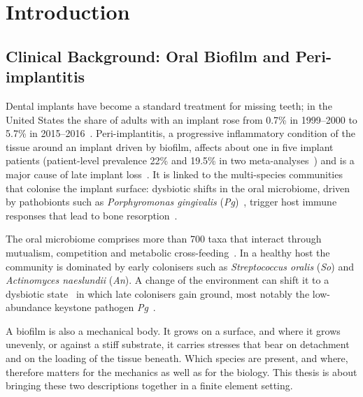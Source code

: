 \chapter{Introduction}
\label{ch:intro}


\section{Clinical Background: Oral Biofilm and Peri-implantitis}
\label{sec:intro_clinical}

Dental implants have become a standard treatment for missing teeth; in the United States the share of adults with an implant rose from 0.7\% in 1999--2000 to 5.7\% in 2015--2016~\cite{Elani2018ImplantTrends}.
Peri-implantitis, a progressive inflammatory condition of the tissue around an implant driven by biofilm, affects about one in five implant patients (patient-level prevalence 22\% and 19.5\% in two meta-analyses~\cite{Derks2015PeriImplantEpi, Diaz2022PeriImplantPrevalence}) and is a major cause of late implant loss~\cite{Berglundh2018Peri, Schwarz2022PeriImplantitis, Sedghi2021PeriImplant}.
It is linked to the multi-species communities that colonise the implant surface: dysbiotic shifts in the oral microbiome, driven by pathobionts such as \textit{Porphyromonas gingivalis} (\textit{Pg})~\cite{Mysak2014Pg}, trigger host immune responses that lead to bone resorption~\cite{Hajishengallis2012Dysbiosis, Lamont2018Periodontal}.

The oral microbiome comprises more than 700 taxa that interact through mutualism, competition and metabolic cross-feeding~\cite{Kolenbrander2010OralMultispecies, Dewhirst2010HOMD}.
In a healthy host the community is dominated by early colonisers such as \textit{Streptococcus oralis} (\textit{So}) and \textit{Actinomyces naeslundii} (\textit{An}).
A change of the environment can shift it to a dysbiotic state~\cite{Marsh2003Dental} in which late colonisers gain ground, most notably the low-abundance keystone pathogen \textit{Pg}~\cite{Hajishengallis2014Polymicrobial}.

A biofilm is also a mechanical body.
It grows on a surface, and where it grows unevenly, or against a stiff substrate, it carries stresses that bear on detachment and on the loading of the tissue beneath.
Which species are present, and where, therefore matters for the mechanics as well as for the biology.
This thesis is about bringing these two descriptions together in a finite element setting.

